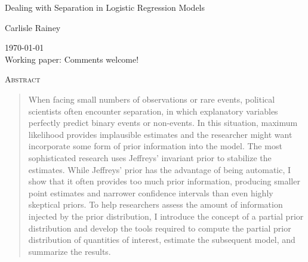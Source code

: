 \documentclass[12pt]{article}
\begin{document}
\begin{center}
{\Large Dealing with Separation in Logistic Regression Models
}

\vspace{10mm}

Carlisle Rainey

\end{center}

\thispagestyle{empty}

\begin{center}
\begin{footnotesize}
\today\\
\vspace{3mm}
Working paper: Comments welcome!
\end{footnotesize}
\end{center}

\vspace{10mm}
{\centerline{\textsc{Abstract}}}
\begin{quote}
\noindent When facing small numbers of observations or rare events, political scientists often encounter separation, in which explanatory variables perfectly predict binary events or non-events. 
In this situation, maximum likelihood provides implausible estimates and the researcher might want incorporate some form of prior information into the model. 
The most sophisticated research uses Jeffreys' invariant prior to stabilize the estimates. 
While Jeffreys' prior has the advantage of being automatic, I show that it often provides too much prior information, producing smaller point estimates and narrower confidence intervals than even highly skeptical priors. 
To help researchers assess the amount of information injected by the prior distribution, I introduce the concept of a partial prior distribution and develop the tools required to compute the partial prior distribution of quantities of interest, estimate the subsequent model, and summarize the results.
\end{quote}
\end{document}
